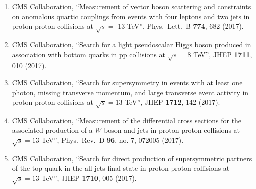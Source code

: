 \begin{itemize}
\begin{enumerate}
\item CMS Collaboration, ``Measurement of vector boson scattering and constraints on anomalous quartic couplings from events with four leptons and two jets in proton-proton collisions at $\sqrt{s}=$ 13 TeV'', Phys.\ Lett.\ B {\bf 774}, 682 (2017).

\item CMS Collaboration, ``Search for a light pseudoscalar Higgs boson produced in association with bottom quarks in pp collisions at $ \sqrt{s}=8 $ TeV'', JHEP {\bf 1711}, 010 (2017).

\item CMS Collaboration, ``Search for supersymmetry in events with at least one photon, missing transverse momentum, and large transverse event activity in proton-proton collisions at $ \sqrt{s}=13 $ TeV'', JHEP {\bf 1712}, 142 (2017).

\item CMS Collaboration, ``Measurement of the differential cross sections for the associated production of a $W$ boson and jets in proton-proton collisions at $\sqrt{s}=13$ TeV'', Phys.\ Rev.\ D {\bf 96}, no. 7, 072005 (2017).

\item CMS Collaboration, ``Search for direct production of supersymmetric partners of the top quark in the all-jets final state in proton-proton collisions at $ \sqrt{s}=13 $ TeV'', JHEP {\bf 1710}, 005 (2017).


\end{enumerate}
\end{itemize}
